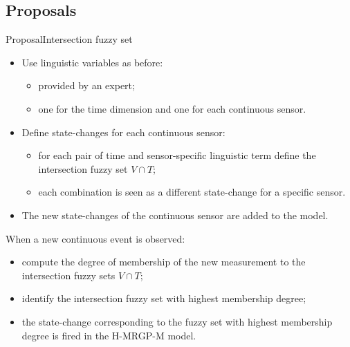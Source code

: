 \documentclass[9pt, handout]{beamer}
\begin{document}
    \subsection{Proposals}
      \begin{frame}{Proposal}{Intersection fuzzy set}
        \pause
        \begin{itemize}
          \item Use linguistic variables as before:
          \begin{itemize}
            \item provided by an expert;
            \item one for the time dimension and one for each continuous sensor.
          \end{itemize}
          \pause
          \item Define state-changes for each continuous sensor:
          \begin{itemize}
            \item for each pair of time and sensor-specific linguistic term define the intersection fuzzy set $V \cap T$;
            \item each combination is seen as a different state-change for a specific sensor.
          \end{itemize}
          \pause
          \item The new state-changes of the continuous sensor are added to the model.
        \end{itemize}
        \pause
        When a new continuous event is observed:
        \pause
        \begin{itemize}
          \item compute the degree of membership of the new measurement to the intersection fuzzy sets $V \cap T$;
          \pause
          \item identify the intersection fuzzy set with highest membership degree;
          \pause
          \item the state-change corresponding to the fuzzy set with highest membership degree is fired in the H-MRGP-M model.
        \end{itemize}
      \end{frame}
      
\end{document}
